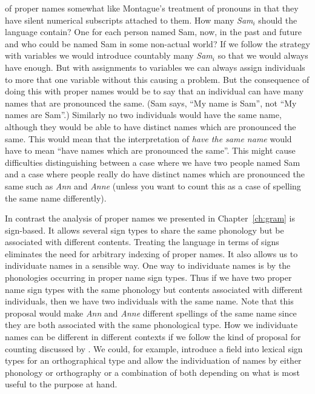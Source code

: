 of proper names somewhat like Montague's treatment of pronouns in that
they have silent numerical subscripts attached to them.  How many
\textit{Sam}$_i$ should the language contain? One for each person
named Sam, now, in the past and future and who could be named Sam in
some non-actual world?  If we follow the strategy with variables we
would introduce countably many \textit{Sam}$_i$ so that we would
always have enough.  But with assignments to variables we can always
assign individuals to more that one variable without this causing a
problem.  But the consequence of doing this with proper names would be
to say that an individual can have many names that are pronounced the
same.  (Sam says, ``My name is Sam'', not ``My names are Sam''.) Similarly no two individuals would have the same name, although
they would be able to have distinct names which are pronounced the
same.  This would mean that the interpretation of \textit{have the
  same name} would have to mean ``have names which are pronounced the
same''.  This might cause difficulties distinguishing between a case
where we have two people named Sam and a case where people really do
have distinct names which are pronounced the same such as \textit{Ann}
and \textit{Anne} (unless you want to count this as a case of spelling
the same name differently).

In contrast the analysis of proper names we presented in
Chapter~\ref{ch:gram} is sign-based.  It allows several sign types to
share the same phonology but be associated with different contents.
Treating the language in terms of signs eliminates the need for
arbitrary indexing of proper names.  It also allows us to individuate
names in a sensible way.  One way to individuate names is by the
phonologies occurring in proper name sign types.  Thus if we have two
proper name sign types with the same phonology but contents associated
with different individuals, then we have two individuals with the same
name.  Note that this proposal would make \textit{Ann} and
\textit{Anne} different spellings of the same name since they are both
associated with the same phonological type.  How we individuate names
can be different in different contexts if we follow the kind of
proposal for counting discussed by \cite{Cooper2011}.  We could, for
example, introduce a field into lexical sign types for an
orthographical type and allow the individuation of names by either
phonology or orthography or a combination of both depending on what is
most useful to the purpose at hand.


